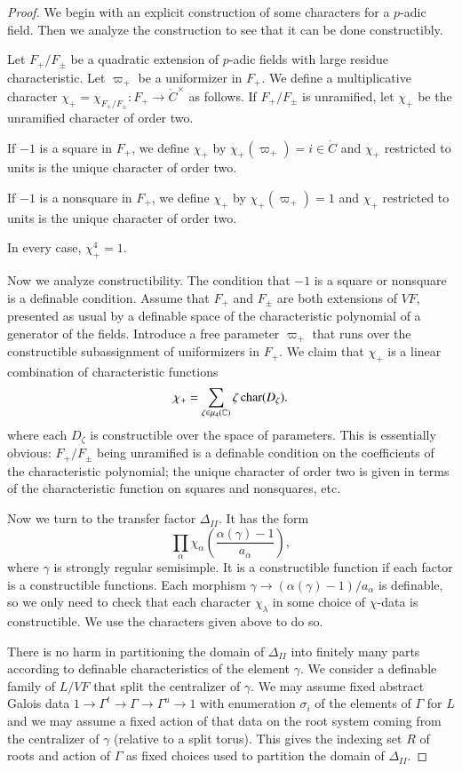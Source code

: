 \begin{proof}  
  We begin with an explicit construction of some characters for a
  $p$-adic field.  Then we analyze the construction to see that it can
  be done constructibly.

  Let $F_+/F_\pm$ be a quadratic extension of $p$-adic fields with
  large residue characteristic.  Let
  $\varpi_+$ be a uniformizer in $F_+$.  We define a multiplicative
  character $\chi_+ = \chi_{F_+/F_{\pm}}:F_+\to \ring{C}^\times$ as
  follows.  If $F_+/F_\pm$ is unramified, let $\chi_+$ be the
  unramified character of order two.

  If $-1$ is a square in $F_+$, we define $\chi_+$ by
  $\chi_+(\varpi_+) = i\in\ring{C}$ and $\chi_+$ restricted to units
  is the unique character of order two.

  If $-1$ is a nonsquare in $F_+$, we define $\chi_+$ by
  $\chi_+(\varpi_+)=1$ and $\chi_+$ restricted to units is the unique
  character of order two.

  In every case, $\chi_+^4 = 1$.

  Now we analyze constructibility.  The condition that $-1$ is a
  square or nonsquare is a definable condition.  Assume that $F_+$ and
  $F_\pm$ are both extensions of $VF$, presented as usual by a
  definable space of the characteristic polynomial of a generator of
  the fields.  Introduce a free parameter $\varpi_+$ that runs over
  the constructible subassignment of uniformizers in $F_+$.  We claim
  that $\chi_+$ is a linear combination of characteristic functions
\[
\chi_+ = \sum_{\zeta\in\mu_4(\mathbb{C})} \zeta\, {\operatorname{char}}(D_\zeta).
\]
where each $D_\zeta$ is constructible over the space of parameters.
This is essentially obvious: $F_+/F_\pm$ being unramified is a
definable condition on the coefficients of the characteristic
polynomial; the unique character of order two is given in terms of the
characteristic function on squares and nonsquares, etc.

Now we turn to the transfer factor $\Delta_{II}$.  It has the form
\[
\prod_\alpha \chi_\alpha
\left(\frac{\alpha(\gamma)-1}{a_\alpha}\right),
\]
where $\gamma$ is strongly regular semisimple.
It is a constructible function if each factor is a constructible
functions. Each morphism $\gamma\to(\alpha(\gamma)-1)/a_\alpha$ is
definable, so we only need to check that each character $\chi_\lambda$
in some choice of $\chi$-data is constructible.  We use the characters
given above to do so.

There is no harm in partitioning the domain of $\Delta_{II}$ into
finitely
many parts according
to definable characteristics of the element $\gamma$.  We consider a
definable family of $L/VF$ that split the centralizer of $\gamma$.  We
may assume fixed abstract Galois data $1\to\Gamma^t\to\Gamma\to
\Gamma^u\to 1$ with enumeration $\sigma_i$ of the elements of $\Gamma$
for $L$ and we may assume a fixed action of that data on the root
system coming from the centralizer of $\gamma$ (relative to a split
torus).  This gives the indexing set $R$ of roots and action of
$\Gamma$ as fixed choices used to partition the domain of
$\Delta_{II}$.


\end{proof}
